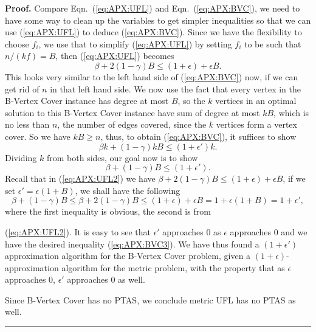 \documentclass[oneside,final]{ucr}
\newenvironment{proof}[1][Proof]{\textbf{#1.} }{\ \rule{0.5em}{0.5em}}
\begin{document}
\begin{proof}
  Compare Eqn.~(\ref{eq:APX:UFL}) and Eqn.~(\ref{eq:APX:BVC}), we need
  to have some way to clean up the variables to get simpler
  inequalities so that we can use (\ref{eq:APX:UFL}) to deduce
  (\ref{eq:APX:BVC}). Since we have the flexibility to choose $f_i$, we
  use that to simplify (\ref{eq:APX:UFL}) by setting $f_i$ to be such
  that $n/(kf) = B$, then (\ref{eq:APX:UFL}) becomes
  \begin{equation}
    \label{eq:APX:UFL2}
    \beta + 2(1-\gamma)B \leq (1+\epsilon) + \epsilon B.
  \end{equation}
  This looks very similar to the left hand side of (\ref{eq:APX:BVC})
  now, if we can get rid of $n$ in that left hand side. We now use the
  fact that every vertex in the B-Vertex Cover instance has degree at
  most $B$, so the $k$ vertices in an optimal solution to this
  B-Vertex Cover instance have sum of degree at most $kB$, which is no
  less than $n$, the number of edges covered, since the $k$ vertices
  form a vertex cover. So we have $kB \geq n$, thus, to obtain
  (\ref{eq:APX:BVC}), it suffices to show
  \begin{equation}
    \label{eq:APX:BVC2}
    \beta k + (1 - \gamma) kB \leq (1 + \epsilon') k.
  \end{equation}
  Dividing $k$ from both sides, our goal now is to show
  \begin{equation}
    \label{eq:APX:BVC3}
    \beta + (1 - \gamma) B \leq (1 + \epsilon').
  \end{equation}
  Recall that in (\ref{eq:APX:UFL2}) we have $\beta + 2(1-\gamma)B
  \leq (1+\epsilon) + \epsilon B$, if we set $\epsilon' = \epsilon (1
  + B)$, we shall have the following
  \begin{equation*}
    \beta + (1-\gamma)B \leq \beta + 2(1-\gamma)B \leq (1+\epsilon) +
    \epsilon B = 1 + \epsilon (1 + B) = 1 + \epsilon',
  \end{equation*}
  where the first inequality is obvious, the second is from

  (\ref{eq:APX:UFL2}).  It is easy to see that $\epsilon'$ approaches
  $0$ as $\epsilon$ approaches $0$ and we have the desired inequality
  (\ref{eq:APX:BVC3}). We have thus found a $(1+\epsilon')$
  approximation algorithm for the B-Vertex Cover problem, given a
  $(1+\epsilon)$-approximation algorithm for the metric {\UFL}
  problem, with the property that as $\epsilon$ approaches $0$,
  $\epsilon'$ approaches $0$ as well.

  Since B-Vertex Cover has no PTAS, we conclude metric UFL has no PTAS
  as well.
\end{proof}
\end{document}
